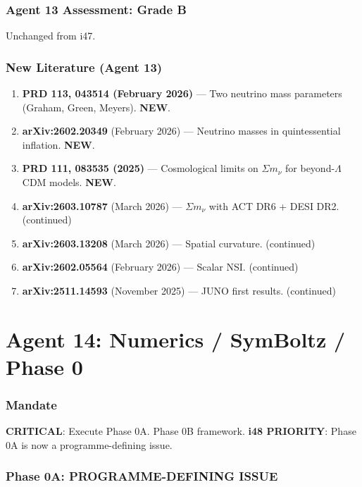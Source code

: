 \documentclass[11pt,a4paper]{article}
\newcommand{\NEW}{\textcolor{dfdblue}{\textbf{NEW}}}
\begin{document}
\section{Agent 13 Assessment: Grade B}

Unchanged from i47.

\section{New Literature (Agent 13)}

\begin{enumerate}
\item \textbf{PRD 113, 043514 (February 2026)} --- Two neutrino mass parameters (Graham, Green, Meyers). \NEW.
\item \textbf{arXiv:2602.20349} (February 2026) --- Neutrino masses in quintessential inflation. \NEW.
\item \textbf{PRD 111, 083535 (2025)} --- Cosmological limits on $\Sigma m_\nu$ for beyond-$\Lambda$CDM models. \NEW.
\item \textbf{arXiv:2603.10787} (March 2026) --- $\Sigma m_\nu$ with ACT DR6 + DESI DR2. (continued)
\item \textbf{arXiv:2603.13208} (March 2026) --- Spatial curvature. (continued)
\item \textbf{arXiv:2602.05564} (February 2026) --- Scalar NSI. (continued)
\item \textbf{arXiv:2511.14593} (November 2025) --- JUNO first results. (continued)
\end{enumerate}


\part{Agent 14: Numerics / SymBoltz / Phase 0}
\label{part:agent14}

\section{Mandate}

\textbf{CRITICAL}: Execute Phase 0A. Phase 0B framework. \textbf{i48 PRIORITY}: Phase 0A is now a programme-defining issue.

\section{Phase 0A: PROGRAMME-DEFINING ISSUE}
\end{document}
